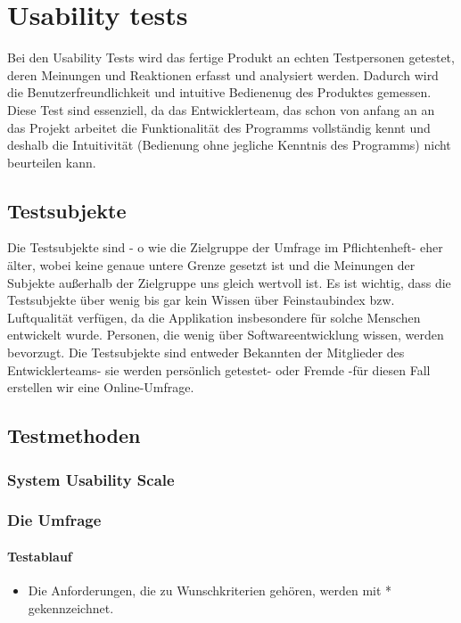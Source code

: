 \section{Usability tests}

Bei den Usability Tests wird das fertige Produkt an echten Testpersonen getestet, deren  Meinungen und Reaktionen erfasst und analysiert werden. Dadurch wird die Benutzerfreundlichkeit und intuitive Bedienenug des Produktes gemessen. Diese Test sind essenziell, da das Entwicklerteam, das schon von anfang an an das Projekt arbeitet die Funktionalität des Programms vollständig kennt und deshalb die Intuitivität (Bedienung ohne jegliche Kenntnis des Programms) nicht beurteilen kann.

\subsection{Testsubjekte}

Die Testsubjekte sind - o wie die Zielgruppe der Umfrage im Pflichtenheft- eher älter, wobei keine genaue untere Grenze gesetzt ist und die Meinungen der Subjekte außerhalb der Zielgruppe uns gleich wertvoll ist. Es ist wichtig, dass die Testsubjekte über wenig bis gar kein Wissen über Feinstaubindex bzw. Luftqualität verfügen, da die Applikation insbesondere für solche Menschen entwickelt wurde. Personen, die wenig über Softwareentwicklung wissen, werden bevorzugt. Die Testsubjekte sind entweder Bekannten der Mitglieder des Entwicklerteams- sie werden persönlich getestet- oder Fremde -für diesen Fall erstellen wir eine Online-Umfrage. 

\subsection{Testmethoden} 
\subsubsection{System Usability Scale}
\subsubsection{Die Umfrage}
\paragraph{Testablauf}
\begin{itemize}
  \item Die Anforderungen, die zu Wunschkriterien gehören, werden mit * gekennzeichnet.
\end{itemize}
